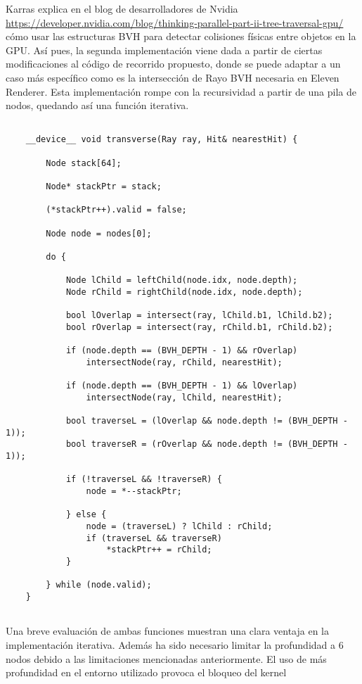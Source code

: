 	
Karras explica en el blog de desarrolladores de Nvidia \url{https://developer.nvidia.com/blog/thinking-parallel-part-ii-tree-traversal-gpu/} cómo usar las estructuras BVH para detectar colisiones físicas entre objetos en la GPU. Así pues, la segunda implementación viene dada a partir de ciertas modificaciones al código de recorrido propuesto, donde se puede adaptar a un caso más específico como es la intersección de Rayo \- BVH necesaria en Eleven Renderer. Esta implementación rompe con la recursividad a partir de una pila de nodos, quedando así una función iterativa.

\begin{lstlisting}
		
	__device__ void transverse(Ray ray, Hit& nearestHit) {

		Node stack[64];

		Node* stackPtr = stack;

		(*stackPtr++).valid = false;

		Node node = nodes[0];

		do {

			Node lChild = leftChild(node.idx, node.depth);
			Node rChild = rightChild(node.idx, node.depth);

			bool lOverlap = intersect(ray, lChild.b1, lChild.b2);
			bool rOverlap = intersect(ray, rChild.b1, rChild.b2);

			if (node.depth == (BVH_DEPTH - 1) && rOverlap)
				intersectNode(ray, rChild, nearestHit);

			if (node.depth == (BVH_DEPTH - 1) && lOverlap)
				intersectNode(ray, lChild, nearestHit);
			
			bool traverseL = (lOverlap && node.depth != (BVH_DEPTH - 1));
			bool traverseR = (rOverlap && node.depth != (BVH_DEPTH - 1));

			if (!traverseL && !traverseR) {
				node = *--stackPtr;

			} else {
				node = (traverseL) ? lChild : rChild;
				if (traverseL && traverseR)
					*stackPtr++ = rChild;
			}

		} while (node.valid);
	}
	
\end{lstlisting}

Una breve evaluación de ambas funciones muestran una clara ventaja en la implementación iterativa. Además ha sido necesario limitar la profundidad a 6 nodos debido a las limitaciones mencionadas anteriormente. El uso de más profundidad en el entorno utilizado provoca el bloqueo del kernel

